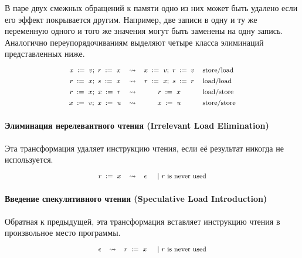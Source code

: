 В паре двух смежных обращений к памяти
одно из них может быть удалено 
если его эффект покрывается другим. 
Например, две записи в одну и ту же переменную 
одного и того же значения могут быть заменены 
на одну запись. 
Аналогично переупорядочиваниям 
выделяют четыре класса элиминаций
представленных ниже. 
%
\[\def\arraystretch{1.4}\footnotesize
  \begin{array}{cccl} 

      \writeInst{}{x}{v} \seq \readInst{}{r}{x} 
    & \leadsto 
    & \writeInst{}{x}{v} \seq \assignInst{r}{v}
    & \text{store/load}  \\ 

      \readInst{}{r}{x} \seq \readInst{}{s}{x} 
    & \leadsto 
    & \readInst{}{r}{x} \seq \assignInst{s}{r}
    & \text{load/load}  \\ 

      \readInst{}{r}{x} \seq \writeInst{}{x}{r} 
    & \leadsto 
    & \readInst{}{r}{x} 
    & \text{load/store}  \\ 

      \writeInst{}{x}{v} \seq \writeInst{}{x}{u} 
    & \leadsto 
    & \writeInst{}{x}{u}
    & \text{store/store}  \\ 

  \end{array}
\]

\paragraph{
Элиминация нерелевантного чтения
(Irrelevant Load Elimination)
}

Эта трансформация удаляет инструкцию чтения, 
если её результат никогда не используется. 
%
\[\def\arraystretch{1.4}\footnotesize
  \begin{array}{cccl} 

      \readInst{}{r}{x} 
    & \leadsto 
    & \epsInst
    & ~|~ \text{$r$ is never used}  \\ 

  \end{array}
\]

\paragraph{
Введение спекулятивного чтения
(Speculative Load Introduction)
}

Обратная к предыдущей, эта трансформация 
вставляет инструкцию чтения в произвольное место программы.
%
\[\def\arraystretch{1.4}\footnotesize
  \begin{array}{cccl} 

      \epsInst
    & \leadsto 
    & \readInst{}{r}{x} 
    & ~|~ \text{$r$ is never used}  \\ 

  \end{array}
\]

